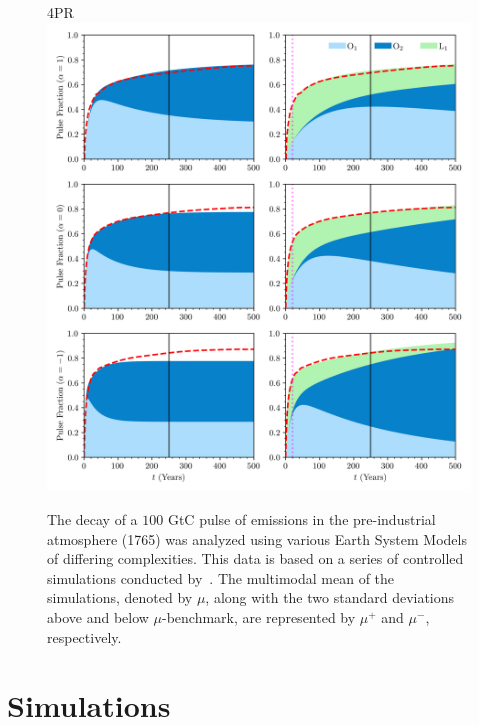 \documentclass[11pt, a4paper, pdftex, twoside, dvipsnames]{article}
\begin{document}
 \begin{figure}[h]
    \centering
	 \raggedright{\hspace{18em}\small{\textsc{4PR}}} 
    \includegraphics[width=\textwidth]{fig/plot_flux_alpha.png}
    \caption{
    The decay of a $100$ GtC pulse of emissions in the pre-industrial atmosphere (1765) was analyzed using various Earth System Models of differing complexities.
    This data is based on a series of controlled simulations conducted by~\cite{joos2013carbon}.
    The multimodal mean of the simulations, denoted by $\mu$, along with the two standard deviations above and below $\mu$-benchmark, are represented by $\mu^+$ and $\mu^-$, respectively.
     }
    \label{fig:fully_fitted}
\end{figure}
%
 
 
 
 

 \section{Simulations}
 
\end{document}
